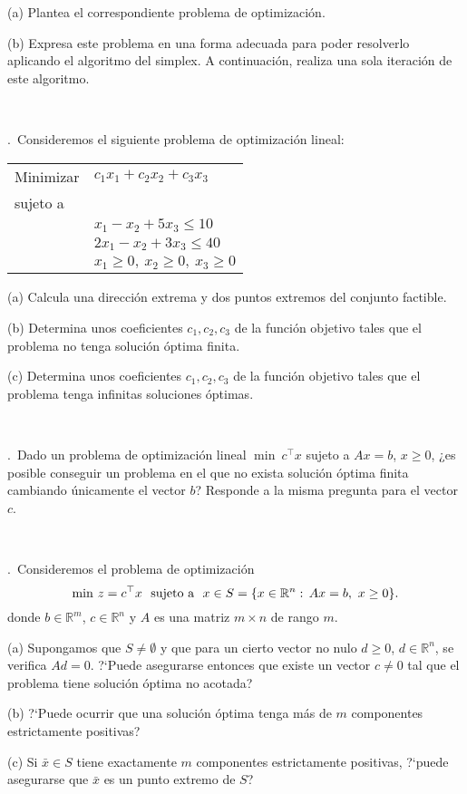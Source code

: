 \documentclass[11pt,a4paper,twoside]{article}
\newcounter{problem} \setcounter{problem}{1}
\newcommand{\ex}{\noindent {\sf \bf \theproblem}\addtocounter{problem}{1}.\ }
\begin{document}
\begin{compactitem}
\item[(a)] Plantea el correspondiente problema de optimizaci\'on.
\item[(b)] Expresa este problema en una forma adecuada para poder
resolverlo aplicando el algoritmo del simplex. A
continuaci\'on, realiza una sola iteraci\'on de este algoritmo.
\end{compactitem}

\


\ex  Consideremos el siguiente problema de optimizaci\'on
lineal:

\begin{center}
\begin{tabular}{ll}
Minimizar & $c_1x_1+c_2x_2+c_3x_3$ \\
sujeto a & \\
& $x_1 - x_2 + 5x_3\leq 10$\\
& $2x_1 - x_2 + 3x_3 \leq 40$\\
&$x_1\geq 0,\ x_2\geq 0,\ x_3\geq 0$
\end{tabular}
\end{center}

\begin{compactitem}
\item[(a)] Calcula una direcci\'on extrema  y dos puntos extremos
  del conjunto factible.
\item[(b)] Determina unos coeficientes $c_1,c_2,c_3$
de la funci\'on objetivo tales que el problema no tenga
soluci\'on \'optima finita.
\item[(c)] Determina unos coeficientes $c_1,c_2,c_3$
de la funci\'on objetivo tales que el problema tenga
infinitas soluciones \'optimas.
\end{compactitem}

\

\ex Dado un problema de optimización lineal $\min\ c^\top x$ sujeto a $Ax=b$, $x\geq 0$, ¿es posible conseguir un problema en el que no exista soluci\'on
\'optima finita cambiando \'unicamente el vector $b$? Responde a la misma pregunta para el vector $c$.

\

\ex Consideremos el problema de optimizaci\'on
\begin{equation*}
{\rm min}\ z=c^\top x\ \ \hbox{sujeto a}\ \ x\in S=\{x\in\mathbb{R}^n:\, Ax= b,\
x\geq 0\}.
\end{equation*}
donde $b\in\mathbb{R}^m$, $c\in\mathbb{R}^n$ y $A$ es una matriz $m\times n$ de
rango $m$.
\begin{compactitem}
\item[(a)] Supongamos que $S\neq\emptyset$ y que para un cierto vector no
nulo $d\geq 0$, $d\in\mathbb{R}^n$, se verifica $Ad=0$. ?`Puede asegurarse
entonces que existe un vector $c\neq 0$ tal que el problema
 tiene soluci\'on \'optima no acotada?
\item[(b)] ?`Puede ocurrir que una soluci\'on \'optima tenga m\'as de $m$
componentes estrictamente positivas?
\item[(c)] Si $\bar x\in S$ tiene exactamente $m$ componentes
estrictamente positivas, ?`puede asegurarse que $\bar x$ es un punto
extremo de $S$?
\end{compactitem}
\end{document}
